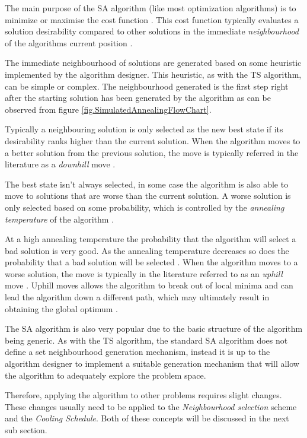 The main purpose of the SA algorithm (like most optimization algorithms) is to minimize or maximise the cost function \cite{SASingleMultiObj}. This cost function typically evaluates a solution desirability compared to other solutions in the immediate \emph{neighbourhood} of the algorithms current position \cite{TheoPraticalSA}. 

The immediate neighbourhood of solutions are generated based on some heuristic implemented by the algorithm designer\cite{AIModernApproach}. This heuristic, as with the TS algorithm, can be simple or complex\cite{}. The neighbourhood generated is the first step right after the starting solution has been generated by the algorithm as can be observed from figure \ref{fig.SimulatedAnnealingFlowChart}.

Typically a neighbouring solution is only selected as the new best state if its desirability ranks higher than the current solution. When the algorithm moves to a better solution from the previous solution, the move is typically referred in the literature as a \emph{downhill} move \cite{CurveFittingSA}.

The best state isn't always selected, in some case the algorithm is also able to move to solutions that are worse than the current solution. A worse solution is only selected based on some probability, which is controlled by the \emph{annealing temperature} of the algorithm \cite{TheoPraticalSA}. 

At a high annealing temperature the probability that the algorithm will select a bad solution is very good. As the annealing temperature decreases so does the probability that a bad solution will be selected \cite{CurveFittingSA}. When the algorithm moves to a worse solution, the move is typically in the literature referred to as an \emph{uphill} move \cite{CurveFittingSA}. Uphill moves allows the algorithm to break out of local minima and can lead the algorithm down a different path, which may ultimately result in obtaining the global optimum \cite{SASingleMultiObj}. 

The SA algorithm is also very popular due to the basic structure of the algorithm being generic\cite{VariousCoolingSA}. As with the TS algorithm, the standard SA algorithm does not define a set neighbourhood generation mechanism, instead it is up to the algorithm designer to implement a suitable generation mechanism that will allow the algorithm to adequately explore the problem space\cite{VariousCoolingSA}. 

Therefore, applying the algorithm to other problems requires slight changes. These changes usually need to be applied to the \emph{Neighbourhood selection} scheme and the \emph{Cooling Schedule}\cite{VariousCoolingSA,DormRoomSA}. Both of these concepts will be discussed in the next sub section.

